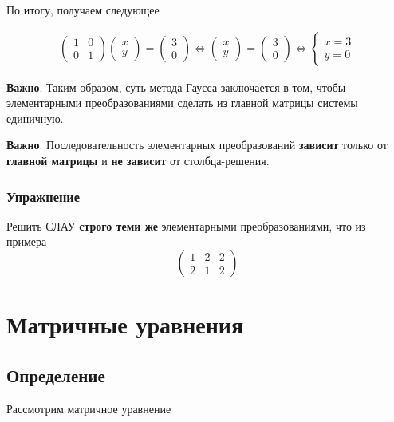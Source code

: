 \documentclass[]{article}
\begin{document}
По итогу, получаем следующее

\begin{gather*}
\begin{pmatrix}
	1 & 0 
	\\
	0 & 1 
\end{pmatrix}
\begin{pmatrix}
	x
	\\
	y 
\end{pmatrix}
=
\begin{pmatrix}
	3
	\\
	0 
\end{pmatrix}
\Leftrightarrow
\begin{pmatrix}
	x
	\\
	y 
\end{pmatrix}
=
\begin{pmatrix}
	3
	\\
	0 
\end{pmatrix}
\Leftrightarrow
\begin{cases}
	x=3
	\\
	y=0
\end{cases}
\end{gather*}


\textbf{Важно}. Таким образом, суть метода Гаусса заключается в том, чтобы элементарными преобразованиями сделать из главной матрицы системы единичную.

\textbf{Важно}. Последовательность элементарных преобразований \textbf{зависит} только от \textbf{главной матрицы} и \textbf{не зависит} от столбца-решения.

\subsubsection{Упражнение}
Решить СЛАУ \textbf{строго теми же} элементарными преобразованиями, что из примера
\begin{equation*}
		\left(
	\begin{array}{ll|l}
		1 & 2 & 2
		\\
		2 & 1 & 2
	\end{array}
	\right)
\end{equation*}

\section{Матричные уравнения}
\subsection{Определение}
Рассмотрим матричное уравнение 
\end{document}
